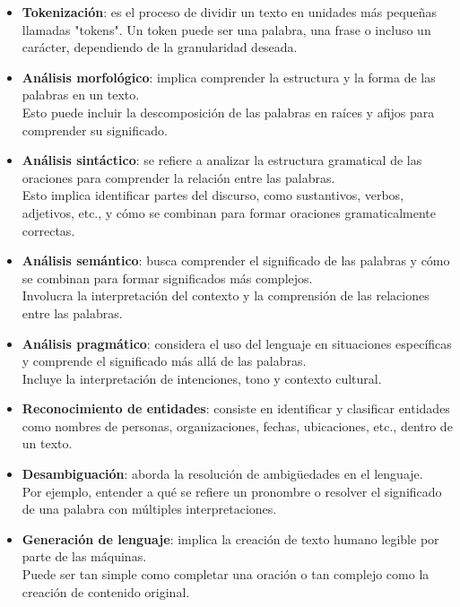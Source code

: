 \begin{itemize}
	\item \textbf{Tokenización}: es el proceso de dividir un texto en unidades más 
	pequeñas llamadas "tokens". Un token puede ser una palabra, 
	una frase o incluso un carácter, dependiendo de la granularidad deseada.
	
	\item \textbf{Análisis morfológico}: implica comprender la estructura y la forma 
	de las palabras en un texto.\\ Esto puede incluir la descomposición 
	de las palabras en raíces y afijos para comprender su significado.

	\item \textbf{Análisis sintáctico}: se refiere a analizar la estructura 
	gramatical de las oraciones para comprender la relación entre las palabras.\\ 
	Esto implica identificar partes del discurso, como sustantivos, verbos, 
	adjetivos, etc., y cómo se combinan para formar oraciones 
	gramaticalmente correctas.
	
	\item \textbf{Análisis semántico}: busca comprender el significado de las palabras y 
	cómo se combinan para formar significados más complejos. \\
	Involucra la interpretación del contexto y la comprensión 
	de las relaciones entre las palabras.
	
	\item \textbf{Análisis pragmático}: considera el uso del lenguaje en situaciones 
	específicas y comprende el significado más allá de las palabras. \\
	Incluye la interpretación de intenciones, tono y contexto cultural.
	
	\item \textbf{Reconocimiento de entidades}: consiste en identificar y clasificar 
	entidades como nombres de personas, organizaciones, fechas, ubicaciones, etc., 
	dentro de un texto.
	
	\item \textbf{Desambiguación}: aborda la resolución de ambigüedades en el lenguaje.\\
	Por ejemplo, entender a qué se refiere un pronombre o resolver el significado 
	de una palabra con múltiples interpretaciones.
	
	\item \textbf{Generación de lenguaje}: implica la creación de texto humano legible por parte 
	de las máquinas.\\ 
	Puede ser tan simple como completar una oración o tan complejo 
	como la creación de contenido original.
		 
\end{itemize}


